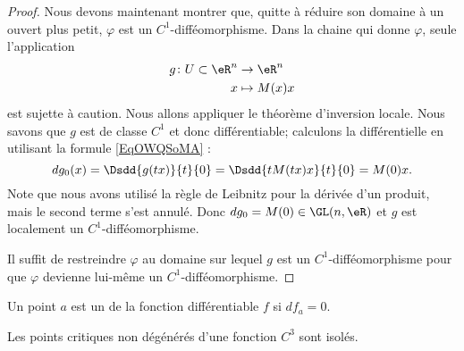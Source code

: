 \begin{proof}
    Nous devons maintenant montrer que, quitte à réduire son domaine à un ouvert plus petit, \( \varphi\) est un \( C^1\)-difféomorphisme. Dans la chaine qui donne \( \varphi\), seule l'application 
    \begin{equation}
        \begin{aligned}
            g\colon U\subset \eR^n&\to \eR^n \\
            x&\mapsto M(x)x 
        \end{aligned}
    \end{equation}
    est sujette à caution. Nous allons appliquer le théorème d'inversion locale. Nous savons que \( g\) est de classe \( C^1\) et donc différentiable; calculons la différentielle en utilisant la formule \eqref{EqOWQSoMA} :
    \begin{equation}
        dg_0(x)=\Dsdd{ g(tx) }{t}{0}=\Dsdd{ tM(tx)x }{t}{0}=M(0)x.
    \end{equation}
    Note que nous avons utilisé la règle de Leibnitz pour la dérivée d'un produit, mais le second terme s'est annulé. Donc \( dg_0=M(0)\in \GL(n,\eR)\) et \( g\) est localement un \( C^1\)-difféomorphisme.

    Il suffit de restreindre \( \varphi\) au domaine sur lequel \( g\) est un \( C^1\)-difféomorphisme pour que \( \varphi\) devienne lui-même un \( C^1\)-difféomorphisme.

\end{proof}

\begin{definition}
    Un point \( a\) est un  de la fonction différentiable \( f\) si \( df_a=0\).
\end{definition}

\begin{corollary}
    Les points critiques non dégénérés d'une fonction \( C^3\) sont isolés.
\end{corollary}

